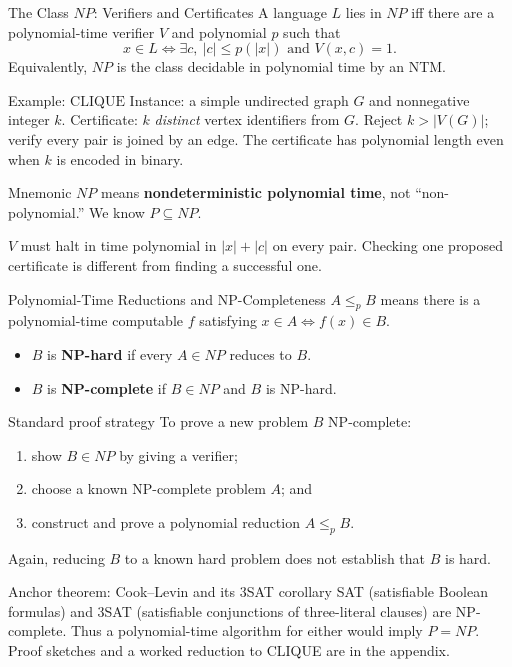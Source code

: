 \documentclass[10pt]{beamer}
\begin{document}
\begin{frame}{The Class $NP$: Verifiers and Certificates}
  \small
  A language $L$ lies in $NP$ iff there are a polynomial-time verifier $V$ and polynomial $p$ such that
  \[
    x\in L
    \iff
    \exists c,\ |c|\le p(|x|)\text{ and }V(x,c)=1.
  \]
  Equivalently, $NP$ is the class decidable in polynomial time by an NTM.
  \begin{block}{Example: $\mathrm{CLIQUE}$}
    Instance: a simple undirected graph $G$ and nonnegative integer $k$.
    Certificate: $k$ \emph{distinct} vertex identifiers from $G$.
    Reject $k>|V(G)|$; verify every pair is joined by an edge.
    The certificate has polynomial length even when $k$ is encoded in binary.
  \end{block}
  \begin{alertblock}{Mnemonic}
    $NP$ means \textbf{nondeterministic polynomial time}, not ``non-polynomial.''
    We know $P\subseteq NP$.
  \end{alertblock}
  $V$ must halt in time polynomial in $|x|+|c|$ on every pair. Checking
  one proposed certificate is different from finding a successful one.
\end{frame}

\begin{frame}{Polynomial-Time Reductions and NP-Completeness}
  \small
  $A\le_p B$ means there is a polynomial-time computable $f$ satisfying
  $x\in A\iff f(x)\in B$.
  \begin{itemize}
    \item $B$ is \textbf{NP-hard} if every $A\in NP$ reduces to $B$.
    \item $B$ is \textbf{NP-complete} if $B\in NP$ and $B$ is NP-hard.
  \end{itemize}
  \begin{block}{Standard proof strategy}
    To prove a new problem $B$ NP-complete:
    \begin{enumerate}
      \item show $B\in NP$ by giving a verifier;
      \item choose a known NP-complete problem $A$; and
      \item construct and prove a polynomial reduction $A\le_p B$.
    \end{enumerate}
  \end{block}
  Again, reducing $B$ to a known hard problem does not establish that $B$ is hard.
  \begin{block}{Anchor theorem: Cook--Levin and its 3SAT corollary}
    SAT (satisfiable Boolean formulas) and 3SAT (satisfiable conjunctions
    of three-literal clauses) are NP-complete. Thus a polynomial-time
    algorithm for either would imply $P=NP$. Proof sketches and a worked
    reduction to CLIQUE are in the appendix.
  \end{block}
\end{frame}
\end{document}
